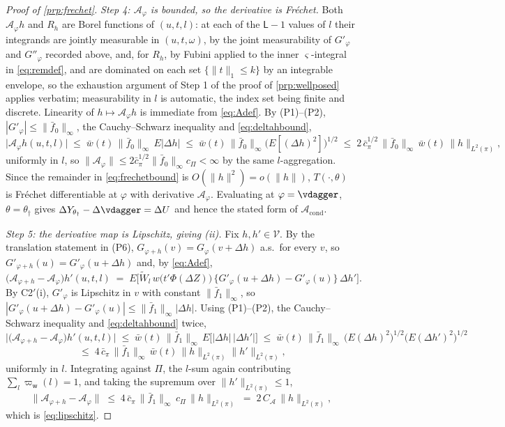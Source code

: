 \begin{proof}[Proof of \cref{prp:frechet}]
\emph{Step 4: $\mathcal A_\varphi$ is bounded, so the derivative is Fr\'echet.}
Both $\mathcal A_\varphi h$ and $R_h$ are Borel functions of $(u,t,l)$: at each of the $\mathsf L-1$
values of $l$ their integrands are jointly
measurable in $(u,t,\omega)$, by the joint measurability of $G'_\varphi$ and $G''_\varphi$ recorded
above, and, for $R_h$, by Fubini applied to the inner $\varsigma$-integral in \eqref{eq:remdef}, and
are dominated on each set $\{\|t\|_1\le k\}$ by an integrable envelope, so the exhaustion argument of
Step 1 of the proof of \cref{prp:wellposed} applies verbatim; measurability in $l$ is automatic, the
index set being finite and discrete.
Linearity of $h\mapsto\mathcal A_\varphi h$ is immediate from \eqref{eq:Adef}. By (P1)--(P2),
$|G'_\varphi|\le\|\bar f_0\|_\infty$, the Cauchy--Schwarz inequality and \eqref{eq:deltahbound},
\[
\big|\mathcal A_\varphi h(u,t,l)\big|\;\le\;\bar w(t)\,\|\bar f_0\|_\infty\,E\big|\Delta h\big|
\;\le\;\bar w(t)\,\|\bar f_0\|_\infty\big(E[(\Delta h)^{2}]\big)^{1/2}
\;\le\;2\,\bar c_\pi^{1/2}\,\|\bar f_0\|_\infty\,\bar w(t)\,\|h\|_{L^{2}(\pi)},
\]
uniformly in $l$, so $\|\mathcal A_\varphi\|\le2\bar c_\pi^{1/2}\|\bar f_0\|_\infty c_\Pi<\infty$ by the
same $l$-aggregation. Since the remainder in
\eqref{eq:frechetbound} is $O(\|h\|^{2})=o(\|h\|)$, $T(\cdot,\theta)$ is Fr\'echet differentiable at
$\varphi$ with derivative $\mathcal A_\varphi$. Evaluating at $\varphi=\vdagger$, $\theta=\theta_\dagger$
gives $\Delta Y_{\theta_\dagger}-\Delta\vdagger=\Delta U$ and hence the stated form of
$\mathcal A_{\mathrm{cond}}$.

\emph{Step 5: the derivative map is Lipschitz, giving (ii).}
Fix $h,h'\in\mathcal V$. By the translation statement in (P6),
$G_{\varphi+h}(v)=G_\varphi(v+\Delta h)$ a.s.\ for every $v$, so
$G'_{\varphi+h}(u)=G'_\varphi(u+\Delta h)$ and, by \eqref{eq:Adef},
\[
\big(\mathcal A_{\varphi+h}-\mathcal A_\varphi\big)h'(u,t,l)
\;=\;E\Big[\widetilde W_l\,w\big(t'\Phi(\Delta Z)\big)\,\big\{G'_\varphi(u+\Delta h)-G'_\varphi(u)\big\}\,\Delta h'\Big].
\]
By C2$'$(i), $G'_\varphi$ is Lipschitz in $v$ with constant $\|\bar f_1\|_\infty$, so
$|G'_\varphi(u+\Delta h)-G'_\varphi(u)|\le\|\bar f_1\|_\infty|\Delta h|$. Using (P1)--(P2), the
Cauchy--Schwarz inequality and \eqref{eq:deltahbound} twice,
\[
\big|\big(\mathcal A_{\varphi+h}-\mathcal A_\varphi\big)h'(u,t,l)\big|
\;\le\;\bar w(t)\,\|\bar f_1\|_\infty\,E\big[|\Delta h|\,|\Delta h'|\big]
\;\le\;\bar w(t)\,\|\bar f_1\|_\infty\,\big(E(\Delta h)^{2}\big)^{1/2}\big(E(\Delta h')^{2}\big)^{1/2}
\]
\[
\;\le\;4\,\bar c_\pi\,\|\bar f_1\|_\infty\,\bar w(t)\,\|h\|_{L^{2}(\pi)}\|h'\|_{L^{2}(\pi)} ,
\]
uniformly in $l$.
Integrating against $\Pi$, the $l$-sum again contributing $\sum_l\varpi_{\mathsf w}(l)=1$, and
taking the supremum over $\|h'\|_{L^{2}(\pi)}\le1$,
\[
\big\|\mathcal A_{\varphi+h}-\mathcal A_\varphi\big\|
\;\le\;4\,\bar c_\pi\,\|\bar f_1\|_\infty\,c_\Pi\,\|h\|_{L^{2}(\pi)}
\;=\;2\,C_{\!\mathcal A}\,\|h\|_{L^{2}(\pi)},
\]
which is \eqref{eq:lipschitz}.
\end{proof}

